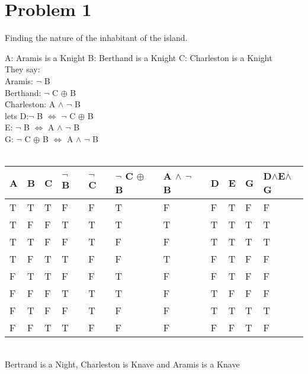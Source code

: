 \documentclass[12pt,letterpaper]{article}
\begin{document}
\section*{Problem 1}
Finding the nature of the inhabitant of the island.

A: Aramis is a Knight
B: Berthand is a Knight
C: Charleston is a Knight\\
They say:\\
Aramis: \({\neg}\) B\\
Berthand: \({\neg}\) C \({\oplus}\) B\\
Charleston: A \({\land}\) \({\neg}\) B\\
lets D:\({\neg}\) B \({\Leftrightarrow}\) \({\neg}\) C \({\oplus}\) B\\
E: \({\neg}\) B \({\Leftrightarrow}\) A \({\land}\) \({\neg}\) B\\
G: \({\neg}\) C \({\oplus}\) B \({\Leftrightarrow}\) A \({\land}\) \({\neg}\) B\\\\
\begin{tabular}{ | m{1cm} | m{1cm}| m{1cm} | m{2em} | m{1cm}| m{4em} | m{5em} | m{1cm}| m{1cm} |  m{1em} | m{2cm}|}
  \hline
  \rowcolor{gray}
  A & B & C & \({\neg}\) B & \({\neg}\) C & \({\neg}\) C \({\oplus}\) B & A \({\land}\) \({\neg}\) B
  &  D & E & G & D\({\land}\)E\({\land}\)G \\
  \hline
  T & T & T & F & F & T & F & F & T & F & F\\
  \hline
  T & F & F & T & T & T & T & T & T & T & T\\
  \hline
  T & T & F & F & T & F & F & T & T & T & T\\
  \hline
  T & F & T & T & F & F & T & F & T & F & F\\
  \hline
  F & T & T & F & F & T & F & F & T & F & F\\
  \hline
  F & F & F & T & T & T & F & T & F & F & F\\
  \hline
  \rowcolor{yellow}
  F & T & F & F & T & F & F & T & T & T & T\\
  \hline
  F & F & T & T & F & F & F & F & F & T & F\\
  \hline
\end{tabular}\\
Bertrand is a Night, Charleston is Knave and Aramis is a Knave
\end{document}
